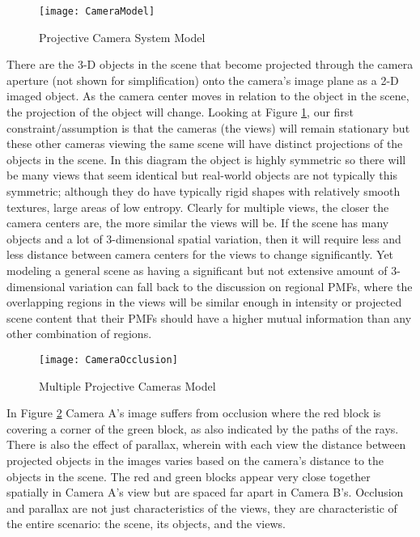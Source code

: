 \begin{figure}[h]
\centering
\texttt{[image: CameraModel]}
\caption{Projective Camera System Model}
\label{CameraModel}
\end{figure}


There are the 3-D objects in the scene that become projected through the camera aperture (not shown for simplification) onto the camera's image plane as a 2-D imaged object. As the camera center moves in relation to the object in the scene, the projection of the object will change. Looking at Figure \ref{CameraModel}, our first constraint/assumption is that the cameras (the views) will remain stationary but these other cameras viewing the same scene will have distinct projections of the objects in the scene. In this diagram the object is highly symmetric so there will be many views that seem identical but real-world objects are not typically this symmetric; although they do have typically rigid shapes with relatively smooth textures, \ie{ }large areas of low entropy. Clearly for multiple views, the closer the camera centers are, the more similar the views will be. If the scene has many objects and a lot of 3-dimensional spatial variation, then it will require less and less distance between camera centers for the views to change significantly. Yet modeling a general scene as having a significant but not extensive amount of 3-dimensional variation can fall back to the discussion on regional PMFs, where the overlapping regions in the views will be similar enough in intensity or projected scene content that their PMFs should have a higher mutual information than any other combination of regions.


\begin{figure}[h]
\centering
\texttt{[image: CameraOcclusion]}
\caption{Multiple Projective Cameras Model}
\label{CameraOcclusion}
\end{figure}

In Figure \ref{CameraOcclusion} Camera A's image suffers from occlusion where the red block is covering a corner of the green block, as also indicated by the paths of the rays. There is also the effect of parallax, wherein with each view the distance between projected objects in the images varies based on the camera's distance to the objects in the scene. The red and green blocks appear very close together spatially in Camera A's view but are spaced far apart in Camera B's. Occlusion and parallax are not just characteristics of the views, they are characteristic of the entire scenario: the scene, its objects, and the views.

